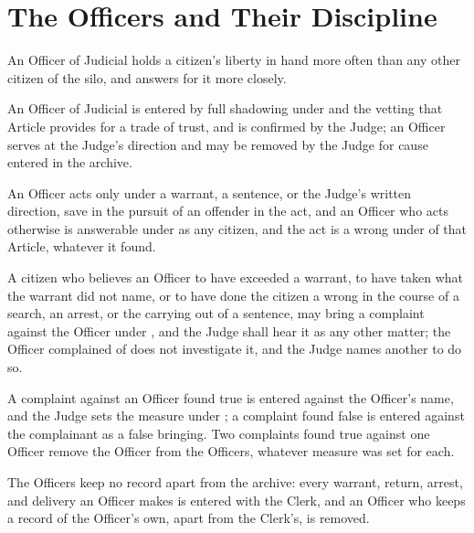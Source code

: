 \section{The Officers and Their Discipline}
\label{sec:judicial:officers-and-their-discipline}

An Officer of Judicial holds a citizen's liberty in hand more often than any other citizen of the silo, and answers for it more closely.

\begin{clauses}
\item An Officer of Judicial is entered by full shadowing under  and the vetting that Article provides for a trade of trust, and is confirmed by the Judge; an Officer serves at the Judge's direction and may be removed by the Judge for cause entered in the archive.
\item An Officer acts only under a warrant, a sentence, or the Judge's written direction, save in the pursuit of an offender in the act, and an Officer who acts otherwise is answerable under  as any citizen, and the act is a wrong under  of that Article, whatever it found.
\item A citizen who believes an Officer to have exceeded a warrant, to have taken what the warrant did not name, or to have done the citizen a wrong in the course of a search, an arrest, or the carrying out of a sentence, may bring a complaint against the Officer under , and the Judge shall hear it as any other matter; the Officer complained of does not investigate it, and the Judge names another to do so.
\item A complaint against an Officer found true is entered against the Officer's name, and the Judge sets the measure under ; a complaint found false is entered against the complainant as a false bringing. Two complaints found true against one Officer remove the Officer from the Officers, whatever measure was set for each.
\item The Officers keep no record apart from the archive: every warrant, return, arrest, and delivery an Officer makes is entered with the Clerk, and an Officer who keeps a record of the Officer's own, apart from the Clerk's, is removed.
\end{clauses}
